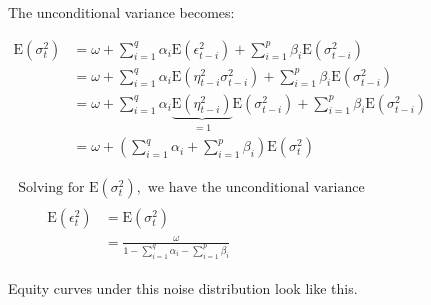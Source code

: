 \documentclass[11pt]{article}
\begin{document}
The unconditional variance becomes:

\(\begin{aligned} \mathrm{E}\left(\sigma_{t}^{2}\right) &=\omega+\sum_{i=1}^{q} \alpha_{i} \mathrm{E}\left(\epsilon_{t-i}^{2}\right)+\sum_{i=1}^{p} \beta_{i} \mathrm{E}\left(\sigma_{t-i}^{2}\right) \\ &=\omega+\sum_{i=1}^{q} \alpha_{i} \mathrm{E}\left(\eta_{t-i}^{2} \sigma_{t-i}^{2}\right)+\sum_{i=1}^{p} \beta_{i} \mathrm{E}\left(\sigma_{t-i}^{2}\right) \\ &=\omega+\sum_{i=1}^{q} \alpha_{i} \underbrace{\mathrm{E}\left(\eta_{t-i}^{2}\right)}_{=1} \mathrm{E}\left(\sigma_{t-i}^{2}\right)+\sum_{i=1}^{p} \beta_{i} \mathrm{E}\left(\sigma_{t-i}^{2}\right) \\ &=\omega+\left(\sum_{i=1}^{q} \alpha_{i}+\sum_{i=1}^{p} \beta_{i}\right) \mathrm{E}\left(\sigma_{t}^{2}\right) \end{aligned}\)

\(\begin{array}{l}{\text { Solving for } \mathrm{E}\left(\sigma_{t}^{2}\right), \text { we have the unconditional variance }} \\ {\qquad \begin{aligned} \mathrm{E}\left(\epsilon_{t}^{2}\right) &=\mathrm{E}\left(\sigma_{t}^{2}\right) \\ &=\frac{\omega}{1-\sum_{i=1}^{q} \alpha_{i}-\sum_{i=1}^{p} \beta_{i}} \end{aligned}}\end{array}\)

Equity curves under this noise distribution look like this.
\end{document}
